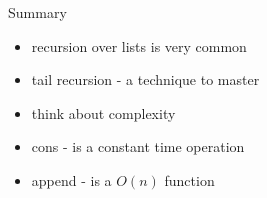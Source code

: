 \begin{frame}{Summary}

\begin{itemize}
 \pause\item recursion over lists is very common
 \pause\item tail recursion - a technique to master 
 \pause\item think about complexity
 \pause\item cons - is a constant time operation
 \pause\item append - is a $O(n)$ function
\end{itemize}

\end{frame}





